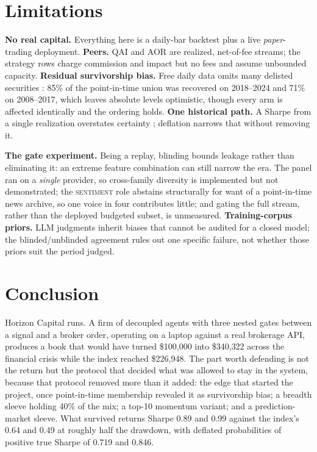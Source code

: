 \documentclass[conference]{IEEEtran}
\begin{document}
\section{Limitations}
\label{sec:limits}

\textbf{No real capital.} Everything here is a daily-bar backtest plus a live
\emph{paper}-trading deployment. \textbf{Peers.} QAI and AOR are realized,
net-of-fee streams; the strategy rows charge commission and impact but no fees
and assume unbounded capacity.
\textbf{Residual survivorship bias.} Free daily data omits many delisted
securities \cite{shumway1997delisting}: 85\% of the point-in-time union was
recovered on 2018--2024 and 71\% on 2008--2017, which leaves absolute levels
optimistic, though every arm is affected identically and the ordering holds.
\textbf{One historical path.} A Sharpe from a single realization overstates
certainty \cite{lo2002statistics,bailey2014deflated}; deflation narrows that
without removing it.

\textbf{The gate experiment.} Being a replay, blinding bounds leakage rather
than eliminating it: an extreme feature combination can still narrow the era.
The panel ran on a \emph{single} provider, so cross-family diversity is
implemented but not demonstrated; the \textsc{sentiment} role abstains
structurally for want of a point-in-time news archive, so one voice in four
contributes little; and gating the full stream, rather than the deployed
budgeted subset, is unmeasured. \textbf{Training-corpus priors.} LLM judgments
inherit biases that cannot be audited for a closed model; the
blinded/unblinded agreement rules out one specific failure, not whether those
priors suit the period judged.

\section{Conclusion}

Horizon Capital runs. A firm of decoupled agents with three nested gates
between a signal and a broker order, operating on a laptop against a real
brokerage API, produces a book that would have turned \$100{,}000 into
\$340{,}322 across the financial crisis while the index reached \$226{,}948.
The part worth defending is not the return but the protocol that decided what
was allowed to stay in the system, because that protocol removed more than it
added: the edge that started the project, once point-in-time membership
revealed it as survivorship bias; a breadth sleeve holding 40\% of the mix; a
top-10 momentum variant; and a prediction-market sleeve. What survived returns
Sharpe 0.89 and 0.99 against the index's 0.64 and 0.49 at roughly half the
drawdown, with deflated probabilities of positive true Sharpe of 0.719 and
0.846.
\end{document}
